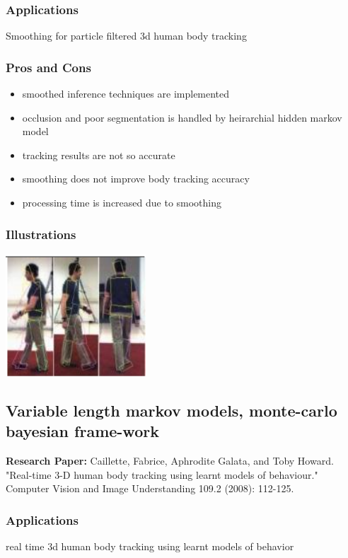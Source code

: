 \documentclass[a4paper,10pt]{report}
\begin{document}
\subsubsection{Applications}
Smoothing for particle filtered 3d human body tracking
\subsubsection{Pros and Cons}
\begin{itemize}
 \item smoothed inference techniques are implemented
 \item occlusion and poor segmentation is handled by heirarchial hidden markov model
 \item tracking results are not so accurate
 \item smoothing does not improve body tracking accuracy
 \item processing time is increased due to smoothing
\end{itemize}
\subsubsection{Illustrations}\newline\newline
\includegraphics{./skeltrack9.png}
\newline \newline

\subsection{Variable length markov models, monte-carlo bayesian frame-work}
\textbf{Research Paper:} Caillette, Fabrice, Aphrodite Galata, and Toby Howard. "Real-time 3-D human body tracking using learnt models of behaviour." Computer Vision and Image Understanding 109.2 (2008): 112-125.
\subsubsection{Applications}
real time 3d human body tracking using learnt models of behavior
\end{document}
